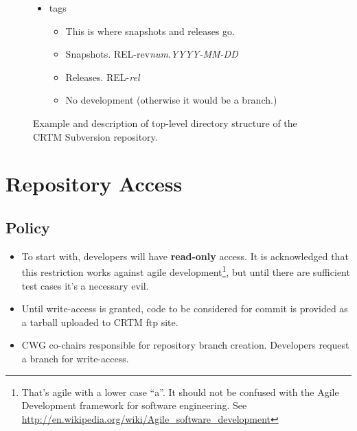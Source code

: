 \begin{figure}[htp]
\begin{minipage}[b]{.475\textwidth}
\begin{itemize}
      \item tags
        \begin{itemize}
          \item This is where snapshots and releases go.
          \item Snapshots. \textsf{REL-rev}\emph{num}.\emph{YYYY-MM-DD}
          \item Releases. \textsf{REL-}\emph{rel}
          \item No development (otherwise it would be a branch.)
        \end{itemize}
    \end{itemize}
  \end{minipage}
  \caption{Example and description of top-level directory structure of the CRTM Subversion repository.}
  \label{fig:CRTM_Repository_Structure}
  \hfill
\end{figure}


\section{Repository Access}
\subsection{Policy}
\begin{itemize}
  \item To start with, developers will have \textbf{read-only} access. It is acknowledged that this restriction works against agile development\footnote{That's agile with a lower case ``a''. It should not be confused with the Agile Development framework for software engineering. See \href{http://en.wikipedia.org/wiki/Agile_software_development}{http://en.wikipedia.org/wiki/Agile\_software\_development}}, but until there are sufficient test cases it's a necessary evil.
  \item Until write-access is granted, code to be considered for commit is provided as a tarball uploaded to CRTM ftp site.
  \item CWG co-chairs responsible for repository branch creation. Developers request a branch for write-access.
\end{itemize}

